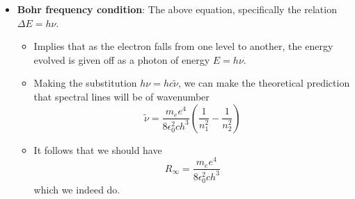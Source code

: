 \documentclass[../notes.tex]{subfiles}
\begin{document}
\begin{itemize}
\begin{equation*}
    \end{equation*}
    \item \textbf{Bohr frequency condition}: The above equation, specifically the relation $\Delta E=h\nu$.
    \begin{itemize}
        \item Implies that as the electron falls from one level to another, the energy evolved is given off as a photon of energy $E=h\nu$.
        \item Making the substitution $h\nu=hc\tilde{\nu}$, we can make the theoretical prediction that spectral lines will be of wavenumber
        \begin{equation*}
            \tilde{\nu} = \frac{m_ee^4}{8\epsilon_0^2ch^3}\left( \frac{1}{n_1^2}-\frac{1}{n_2^2} \right)
        \end{equation*}
        \item It follows that we should have
        \begin{equation*}
            R_\infty = \frac{m_ee^4}{8\epsilon_0^2ch^3}
        \end{equation*}
        which we indeed do.
    \end{itemize}
\end{itemize}
\end{document}

